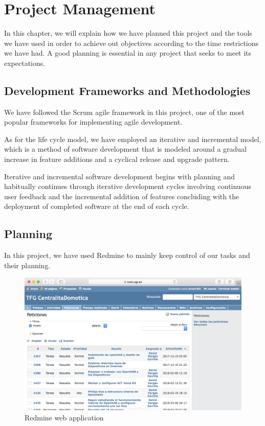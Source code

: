 \chapter{Project Management}



In this chapter, we will explain how we have planned this project and the tools we have used in order to achieve out objectives 
according to the time restrictions we have had. A good planning is essential in any project that seeks to meet its expectations.

\section{Development Frameworks and Methodologies}
We have followed the Scrum agile framework in this project, one of the most popular frameworks for implementing agile development.

As for the life cycle model, we have employed an iterative and incremental model, which is a method of software development that is 
modeled around a gradual increase in feature additions and a cyclical release and upgrade pattern.\cite{techopediaIterative}

Iterative and incremental software development begins with planning and habitually continues through iterative development cycles 
involving continuous user feedback and the incremental addition of features concluding with the deployment of completed software 
at the end of each cycle. 

\bigskip
\section{Planning}
In this project, we have used Redmine to mainly keep control of our tasks and their planning.

\begin{figure}
	\centering
	\includegraphics[width=1\textwidth]{images/Chapter_02/redmine.png}
	\caption{Redmine web application}
	\label{fig:redmine}
\end{figure}

